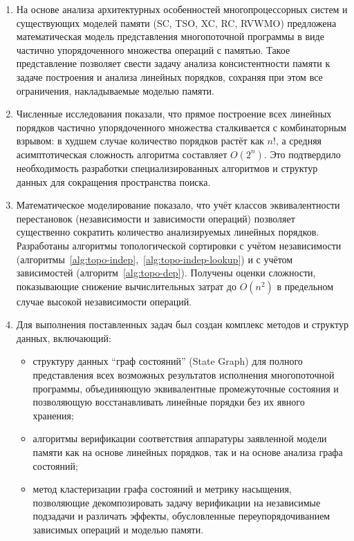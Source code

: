 \begin{enumerate}
  \item На основе анализа архитектурных особенностей
    многопроцессорных систем и существующих моделей памяти (SC, TSO,
    XC, RC, RVWMO) предложена математическая модель представления
    многопоточной программы в виде частично упорядоченного множества
    операций с памятью. Такое представление позволяет свести задачу
    анализа консистентности памяти к задаче построения и анализа
    линейных порядков, сохраняя при этом все ограничения,
    накладываемые моделью памяти.
  \item Численные исследования показали, что прямое построение всех
    линейных порядков частично упорядоченного множества сталкивается
    с комбинаторным взрывом: в худшем случае количество порядков
    растёт как $n!$, а средняя асимптотическая сложность алгоритма
    составляет $O(2^n)$. Это подтвердило необходимость разработки
    специализированных алгоритмов и структур данных для сокращения
    пространства поиска.
  \item Математическое моделирование показало, что учёт классов
    эквивалентности перестановок (независимости и зависимости
    операций) позволяет существенно сократить количество
    анализируемых линейных порядков. Разработаны алгоритмы
    топологической сортировки с учётом независимости
    (алгоритмы~\ref{alg:topo-indep},~\ref{alg:topo-indep-lookup}) и с
    учётом зависимостей (алгоритм~\ref{alg:topo-dep}). Получены
    оценки сложности, показывающие снижение вычислительных затрат до
    $O(n^2)$ в предельном случае высокой независимости операций.
  \item Для выполнения поставленных задач был создан комплекс методов
    и структур данных, включающий:
    \begin{itemize}
      \item структуру данных ``граф состояний'' (State Graph) для
        полного представления всех возможных результатов исполнения
        многопоточной программы, объединяющую эквивалентные
        промежуточные состояния и позволяющую восстанавливать
        линейные порядки без их явного хранения;
      \item алгоритмы верификации соответствия аппаратуры заявленной
        модели памяти как на основе линейных порядков, так и на
        основе анализа графа состояний;
      \item метод кластеризации графа состояний и метрику насыщения,
        позволяющие декомпозировать задачу верификации на независимые
        подзадачи и различать эффекты, обусловленные
        переупорядочиванием зависимых операций и моделью памяти.
    \end{itemize}
\end{enumerate}

